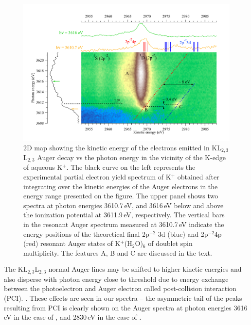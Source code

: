 \begin{figure}[h!]
\centering
\includegraphics[scale=0.55]{figures/k_2dmap.pdf}
\caption{2D map showing the kinetic energy of the electrons emitted in KL$_{2,3}$L$_{2,3}$ Auger decay vs the photon energy in the vicinity of the K-edge of aqueous K$^{+}$. The black curve on the left represents the experimental partial electron yield spectrum of K$^{+}$ obtained after integrating over the kinetic energies of the Auger electrons in the energy range presented on the figure. The upper panel shows two spectra at photon energies 3610.7\,eV, and 3616\,eV below and above the ionization potential at 3611.9\,eV, respectively. The vertical bars in the resonant Auger spectrum measured at 3610.7\,eV indicate the energy positions of the theoretical final 2p$^{-2}$ 3d (blue) and 2p$^{-2}$4p (red) resonant Auger states of K$^{+}$(H$_2$O)$_6$ of doublet spin multiplicity. The features A, B and C are discussed in the text.}
\label{fg:2dmap_k}
\end{figure}



The KL$_{2,3}$L$_{2,3}$ normal Auger lines may be shifted to higher kinetic energies and also disperse with photon energy close to threshold due to energy exchange between the photoelectron and Auger electron called post-collision interaction (PCI). %
\citep{russek86:911,guillemin15:012503}. These effects are seen in our spectra -- the asymmetric tail of the peaks resulting from PCI is clearly shown on the Auger spectra at photon energies 3616\,eV in the case of \ki, and 2830\,eV in the case of \cli.



